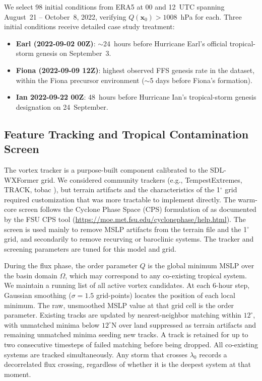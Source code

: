 \documentclass[11pt]{article}
\begin{document}
We select 98 initial conditions from ERA5 at 00 and 12~UTC spanning August~21 --
October~8, 2022, verifying $Q(\mathbf{x}_0) > 1008$~hPa for each. Three initial
conditions receive detailed case study treatment:
\begin{itemize}\setlength\itemsep{2pt}
\item \textbf{Earl (2022-09-02 00Z)}: $\sim$24~hours before Hurricane Earl's official tropical-storm genesis on September~3.
\item \textbf{Fiona (2022-09-09 12Z)}: highest observed FFS genesis rate in the dataset, within the Fiona precursor environment ($\sim$5 days before Fiona's formation).
\item \textbf{Ian 2022-09-22 00Z}: 48~hours before Hurricane Ian's tropical-storm genesis designation on 24~September.
\end{itemize}

\subsection{Feature Tracking and Tropical Contamination Screen}

The vortex tracker is a purpose-built component calibrated to the SDL-WXFormer grid.
We considered community trackers (e.g., TempestExtremes, TRACK, tobac
\citep{heikenfeld2019tobac}), but terrain artifacts and the characteristics of the
1$^\circ$ grid required customization that was more tractable to implement directly.
The warm-core screen follows the Cyclone Phase Space (CPS) formulation of
\citet{hart2003cyclone} as documented by the FSU CPS tool
(\url{https://moe.met.fsu.edu/cyclonephase/help.html}).
The screen is used mainly to remove MSLP artifacts from the terrain file and the
1$^\circ$ grid, and secondarily to remove recurving or baroclinic systems.
The tracker and screening parameters are tuned for this model and grid.

During the flux phase, the order parameter $Q$ is the global minimum MSLP over the basin domain $\Omega$, which may correspond to any co-existing tropical system. We maintain a running list of all active vortex candidates.
At each 6-hour step, Gaussian smoothing ($\sigma=1.5$ grid-points) locates the
position of each local minimum. The raw, unsmoothed MSLP value at that grid cell is the order parameter.
Existing tracks are updated by nearest-neighbor matching within $12^\circ$, with
unmatched minima below $12^\circ$N over land suppressed as terrain artifacts and
remaining unmatched minima seeding new tracks.
A track is retained for up to two consecutive timesteps of failed matching before
being dropped.
All co-existing systems are tracked simultaneously. Any storm that crosses $\lambda_0$
records a decorrelated flux crossing, regardless of whether it is the deepest system
at that moment.
\end{document}
